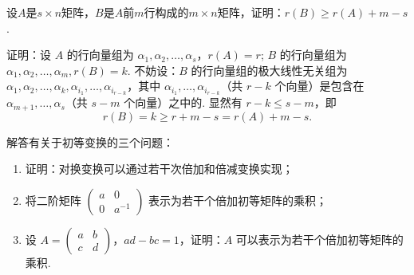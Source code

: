 \begin{exercise}
\begin{exgroup}
        \item 设$A$是$s \times n$矩阵，$B$是$A$前$m$行构成的$m \times n$矩阵，证明：$r(B) \geqslant r(A) + m - s$.
        \begin{answer}
            证明：设 $A$ 的行向量组为 $\alpha_1,\alpha_2,\ldots,\alpha_s$，$r(A)=r$; $B$ 的行向量组为 $\alpha_1,\alpha_2,\ldots,\alpha_m ,r(B)=k$.
            不妨设：$B$ 的行向量组的极大线性无关组为 $\alpha_1,\alpha_2,\ldots,\alpha_k,\alpha_{i_1},\ldots,\alpha_{i_{r-k}}$，其中 $\alpha_{i_1},\ldots,\alpha_{i_{r-k}}$（共 $r-k$ 个向量）是包含在 $\alpha_{m+1},\ldots,\alpha_s$（共 $s-m$ 个向量）之中的. 显然有 $r-k \leqslant s-m $，即
            \[r(B)=k\geqslant r+m-s=r(A)+m-s.\]
        \end{answer}
    \end{exgroup}

    \begin{exgroup}
        \item 解答有关于初等变换的三个问题：
        \begin{enumerate}
            \item 证明：对换变换可以通过若干次倍加和倍减变换实现；
            \item 将二阶矩阵 $\begin{pmatrix}
                a & 0 \\ 0 & a^{-1}
            \end{pmatrix}$ 表示为若干个倍加初等矩阵的乘积；
            \item 设 $A = \begin{pmatrix}
                a & b \\ c & d
            \end{pmatrix}$，$ad - bc = 1$，证明：$A$ 可以表示为若干个倍加初等矩阵的乘积.
        \end{enumerate}
        \begin{answer}

        \end{answer}


\end{exgroup}
\end{exercise}

